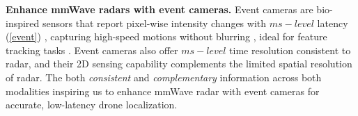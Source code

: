 

\noindent \textbf{Enhance mmWave radars with event cameras.}
Event cameras are bio-inspired sensors that report pixel-wise intensity changes with $ms-level$ latency (\fig \ref{event}) \cite{xu2023taming}, capturing high-speed motions without blurring \cite{he2024microsaccade}, ideal for feature tracking tasks \cite{alzugaray2018asynchronous}.
Event cameras also offer $ms-level$ time resolution consistent to radar, and their 2D sensing capability complements the limited spatial resolution of radar.
The both \textit{consistent} and \textit{complementary} information across both modalities inspiring us to enhance mmWave radar with event cameras for accurate, low-latency drone localization.

